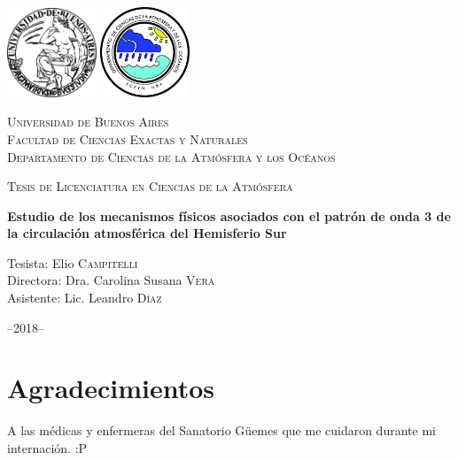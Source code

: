 \documentclass[spanish,a4paper,12pt,oneside]{book}
\title{}
\author{Elio Campitelli}
\date{}
\begin{document}
\frontmatter

\begin{titlepage}
    \centering
    \includegraphics[width=0.2\textwidth]{logoUBA}  \hfill \includegraphics[width=0.2\textwidth]{logoDCAO} \par
    \vspace{0.5cm}
    {\scshape\LARGE Universidad de Buenos Aires  \\
    \large Facultad de Ciencias Exactas y Naturales \\
Departamento de Ciencias de la Atmósfera y los Océanos  \par}
    \vspace{0.5cm}
    {\scshape\Large Tesis de Licenciatura en Ciencias de la Atmósfera\par}
    \vspace{1cm}
    {\huge\bfseries Estudio de los mecanismos físicos asociados con el patrón de onda 3 de la circulación atmosférica del Hemisferio Sur\par}
    \vspace{1.5cm}
    {\Large Tesista: Elio \textsc{Campitelli} \\
        Directora:  Dra. Carolina Susana \textsc{Vera} \\
        Asistente: Lic. Leandro \textsc{Díaz}
    \par}
    \vfill

    {\large --2018--\par}
\end{titlepage}

\chapter*{Agradecimientos}

A las médicas y enfermeras del Sanatorio Güemes que me cuidaron durante
mi internación. :P

\newpage
\end{document}
